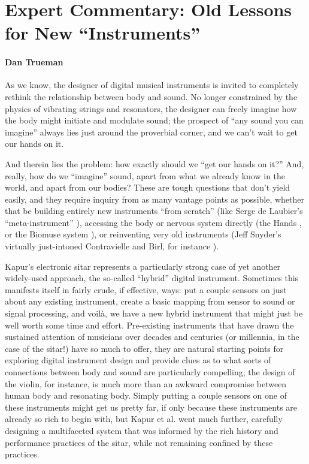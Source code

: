 \section*{Expert Commentary: Old Lessons for New ``Instruments''}


\paragraph{Dan Trueman}


As we know, the designer of digital musical instruments is invited to completely rethink the relationship between body and sound. No longer constrained by the physics of vibrating strings and resonators, the designer can freely imagine how the body might initiate and modulate sound; the prospect of ``any sound you can imagine'' always lies just around the proverbial corner, and we can't wait to get our hands on it. 

And therein lies the problem: how exactly should we ``get our hands on it?'' And, really, how do we ``imagine'' sound, apart from what we already know in the world, and apart from our bodies? These are tough questions that don't yield easily, and they require inquiry from as many vantage points as possible, whether that be building entirely new instruments ``from scratch'' (like Serge de Laubier's ``meta-instrument'' \cite{Laubier:1998}), accessing the body or nervous system directly (the Hands \cite{Waisvisz:1985}, or the Biomuse system \cite{Knapp:2009}), or reinventing very old instruments (Jeff Snyder's virtually just-intoned Contravielle and Birl, for instance \cite{Snyder:2010}). 

Kapur's electronic sitar represents a particularly strong case of yet another widely-used approach, the so-called ``hybrid'' digital instrument. Sometimes this manifests itself in fairly crude, if effective, ways: put a couple sensors on just about any existing instrument, create a basic mapping from sensor to sound or signal processing, and voil\`{a}, we have a new hybrid instrument that might just be well worth some time and effort. Pre-existing instruments that have drawn the sustained attention of musicians over decades and centuries (or millennia, in the case of the sitar!) have so much to offer, they are natural starting points for exploring digital instrument design and provide clues as to what sorts of connections between body and sound are particularly compelling; the design of the violin, for instance, is much more than an awkward compromise between human body and resonating body. Simply putting a couple sensors on one of these instruments might get us pretty far, if only because these instruments are already so rich to begin with, but Kapur et al. went much further, carefully designing a multifaceted system that was informed by the rich history and performance practices of the sitar, while not remaining confined by these practices. 

